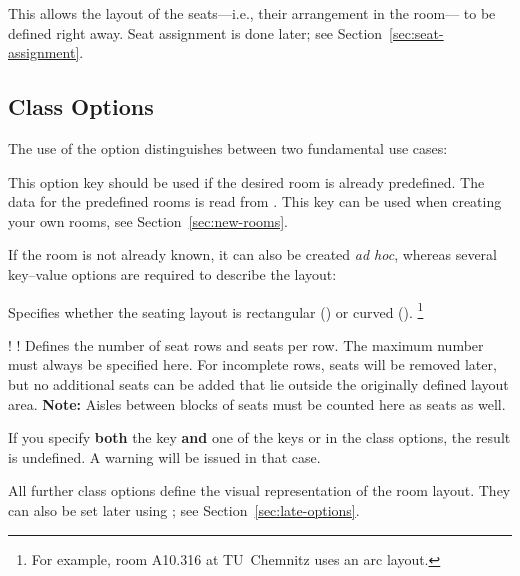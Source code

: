 \documentclass[
babel-options={english},
load-preamble-,
title=compact
]{cnltx-doc}
\begin{document}
This allows the layout of the seats—i.e., their arrangement in the room—
to be defined right away. Seat assignment is done later;
see Section~\ref{sec:seat-assignment}.

\subsection{Class Options}
\label{sec:class-options}
The use of the option  distinguishes between two fundamental use cases:
\begin{options}
   This option key should be used if the desired room
  is already predefined.
  The data for the predefined rooms is read
  from .
  This key can be used when creating your own rooms, see
  Section~\ref{sec:new-rooms}.
\end{options}
If the room is not already known, it can also be created \emph{ad hoc}, whereas
several key–value options are required to describe the layout: 

\begin{options}
  Specifies whether the seating layout is rectangular () or curved ().%
  \footnote{For example, room A10.316 at TU~Chemnitz uses an arc layout.}

  \Default*!{}\vspace{-.3\baselineskip}
  \Default!{}
  Defines the number of seat rows and seats per row. The maximum number must always be specified here.
  For incomplete rows, seats will be removed later, but no additional seats can be added that lie outside
  the originally defined layout area.
  \textbf{Note:} Aisles between blocks of seats must be counted here as seats as well.
\end{options}

If you specify \textbf{both} the  key \textbf{and} one of the keys
 or  in the class options, the result is undefined.
A warning will be issued in that case.\medskip

All further class options define the visual representation of the room layout.
They can also be set later using ; see Section~\ref{sec:late-options}.
\end{document}
